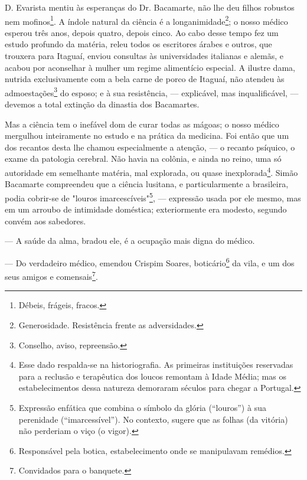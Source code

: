 D. Evarista mentiu às esperanças do Dr. Bacamarte, não lhe deu filhos
robustos nem mofinos\footnote{Débeis, frágeis, fracos.}. A índole
natural da ciência é a longanimidade\footnote{Generosidade. Resistência
  frente as adversidades.}; o nosso médico esperou três anos, depois
quatro, depois cinco. Ao cabo desse tempo fez um estudo profundo da
matéria, releu todos os escritores árabes e outros, que trouxera para
Itaguaí, enviou consultas às universidades italianas e alemãs, e acabou
por aconselhar à mulher um regime alimentício especial. A ilustre dama,
nutrida exclusivamente com a bela carne de porco de Itaguaí, não atendeu
às admoestações\footnote{Conselho, aviso, repreensão.} do esposo; e à
sua resistência, --- explicável, mas inqualificável, --- devemos a total
extinção da dinastia dos Bacamartes.

Mas a ciência tem o inefável dom de curar todas as mágoas; o nosso
médico mergulhou inteiramente no estudo e na prática da medicina. Foi
então que um dos recantos desta lhe chamou especialmente a atenção, ---
o recanto psíquico, o exame da patologia cerebral. Não havia na colônia,
e ainda no reino, uma só autoridade em semelhante matéria, mal
explorada, ou quase inexplorada\footnote{Esse dado respalda-se na
  historiografia. As primeiras instituições reservadas para a reclusão e
  terapêutica dos loucos remontam à Idade Média; mas os estabelecimentos
  dessa natureza demoraram séculos para chegar a Portugal.}. Simão
Bacamarte compreendeu que a ciência lusitana, e particularmente a
brasileira, podia cobrir-se de "louros imarcescíveis"\footnote{Expressão
  enfática que combina o símbolo da glória (``louros'') à sua perenidade
  (``imarcessível''). No contexto, sugere que as folhas (da vitória) não
  perderiam o viço (o vigor).}, --- expressão usada por ele mesmo, mas
em um arroubo de intimidade doméstica; exteriormente era modesto,
segundo convém aos sabedores.

--- A saúde da alma, bradou ele, é a ocupação mais digna do médico.

--- Do verdadeiro médico, emendou Crispim Soares, boticário\footnote{Responsável
  pela botica, estabelecimento onde se manipulavam remédios.} da vila, e
um dos seus amigos e comensais\footnote{Convidados para o banquete.}.

